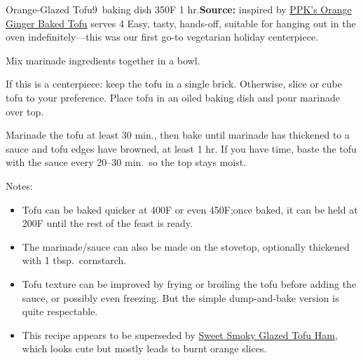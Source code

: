 \begin{recipe}{Orange-Glazed Tofu}{9\inch{}\inch\ baking dish \hfill 350\0F \hfill 1 hr.}{\textbf{Source:} inspired by \href{https://web.archive.org/web/20101121022851/https://www.theppk.com/2010/04/orange-ginger-baked-tofu/}{PPK's Orange Ginger Baked Tofu} \hfill serves 4}
 \freeform Easy, tasty, hands-off, suitable for hanging out in the oven indefinitely---this was our first go-to vegetarian holiday centerpiece.

 Mix marinade ingredients together in a bowl.

 If this is a centerpiece: keep the tofu in a single brick. Otherwise, slice or cube tofu to your preference. Place tofu in an oiled baking dish and pour marinade over top.

 \newstep Marinade the tofu at least 30 min., then bake until marinade has thickened to a sauce and tofu edges have browned, at least 1 hr. If you have time, baste the tofu with the sauce every 20--30 min.\ so the top stays moist.

 \freeform Notes:
 \begin{itemize}
  \item Tofu can be baked quicker at 400\0F or even 450\0F;\@ once baked, it can be held at 200\0F until the rest of the feast is ready.
  \item The marinade/sauce can also be made on the stovetop, optionally thickened with 1 tbsp.\ cornstarch.
  \item Tofu texture can be improved by frying or broiling the tofu before adding the sauce, or possibly even freezing. But the simple dump-and-bake version is quite respectable.
  \item This recipe appears to be superseded by \href{https://www.theppk.com/2016/12/sweet-smoky-glazed-tofu-ham/}{Sweet \And Smoky Glazed Tofu Ham}, which looks cute but mostly leads to burnt orange slices.
 \end{itemize}
\end{recipe}
